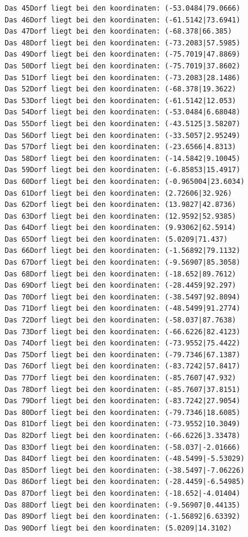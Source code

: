 \documentclass{article}
\begin{document}
\begin{verbatim}
Das 45Dorf liegt bei den koordinaten: (-53.0484|79.0666)
Das 46Dorf liegt bei den koordinaten: (-61.5142|73.6941)
Das 47Dorf liegt bei den koordinaten: (-68.378|66.385)
Das 48Dorf liegt bei den koordinaten: (-73.2083|57.5985)
Das 49Dorf liegt bei den koordinaten: (-75.7019|47.8869)
Das 50Dorf liegt bei den koordinaten: (-75.7019|37.8602)
Das 51Dorf liegt bei den koordinaten: (-73.2083|28.1486)
Das 52Dorf liegt bei den koordinaten: (-68.378|19.3622)
Das 53Dorf liegt bei den koordinaten: (-61.5142|12.053)
Das 54Dorf liegt bei den koordinaten: (-53.0484|6.68048)
Das 55Dorf liegt bei den koordinaten: (-43.5125|3.58207)
Das 56Dorf liegt bei den koordinaten: (-33.5057|2.95249)
Das 57Dorf liegt bei den koordinaten: (-23.6566|4.8313)
Das 58Dorf liegt bei den koordinaten: (-14.5842|9.10045)
Das 59Dorf liegt bei den koordinaten: (-6.85853|15.4917)
Das 60Dorf liegt bei den koordinaten: (-0.965004|23.6034)
Das 61Dorf liegt bei den koordinaten: (2.72606|32.926)
Das 62Dorf liegt bei den koordinaten: (13.9827|42.8736)
Das 63Dorf liegt bei den koordinaten: (12.9592|52.9385)
Das 64Dorf liegt bei den koordinaten: (9.93062|62.5914)
Das 65Dorf liegt bei den koordinaten: (5.0209|71.437)
Das 66Dorf liegt bei den koordinaten: (-1.56892|79.1132)
Das 67Dorf liegt bei den koordinaten: (-9.56907|85.3058)
Das 68Dorf liegt bei den koordinaten: (-18.652|89.7612)
Das 69Dorf liegt bei den koordinaten: (-28.4459|92.297)
Das 70Dorf liegt bei den koordinaten: (-38.5497|92.8094)
Das 71Dorf liegt bei den koordinaten: (-48.5499|91.2774)
Das 72Dorf liegt bei den koordinaten: (-58.037|87.7638)
Das 73Dorf liegt bei den koordinaten: (-66.6226|82.4123)
Das 74Dorf liegt bei den koordinaten: (-73.9552|75.4422)
Das 75Dorf liegt bei den koordinaten: (-79.7346|67.1387)
Das 76Dorf liegt bei den koordinaten: (-83.7242|57.8417)
Das 77Dorf liegt bei den koordinaten: (-85.7607|47.932)
Das 78Dorf liegt bei den koordinaten: (-85.7607|37.8151)
Das 79Dorf liegt bei den koordinaten: (-83.7242|27.9054)
Das 80Dorf liegt bei den koordinaten: (-79.7346|18.6085)
Das 81Dorf liegt bei den koordinaten: (-73.9552|10.3049)
Das 82Dorf liegt bei den koordinaten: (-66.6226|3.33478)
Das 83Dorf liegt bei den koordinaten: (-58.037|-2.01666)
Das 84Dorf liegt bei den koordinaten: (-48.5499|-5.53029)
Das 85Dorf liegt bei den koordinaten: (-38.5497|-7.06226)
Das 86Dorf liegt bei den koordinaten: (-28.4459|-6.54985)
Das 87Dorf liegt bei den koordinaten: (-18.652|-4.01404)
Das 88Dorf liegt bei den koordinaten: (-9.56907|0.44135)
Das 89Dorf liegt bei den koordinaten: (-1.56892|6.63392)
Das 90Dorf liegt bei den koordinaten: (5.0209|14.3102)

\end{verbatim}
\end{document}

